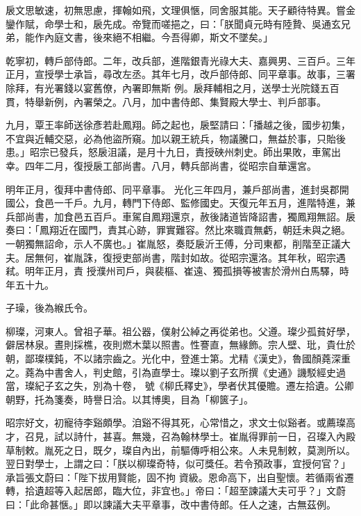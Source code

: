 \begin{pinyinscope}
 扆文思敏速，初無思慮，揮翰如飛，文理俱愜，同舍服其能。天子顧待特異。嘗金鑾作賦，命學士和，扆先成。帝覽而嗟挹之，曰：「朕聞貞元時有陸贄、吳通玄兄弟，能作內庭文書，後來絕不相繼。今吾得卿，斯文不墜矣。」



 乾寧初，轉戶部侍郎。二年，改兵部，進階銀青光祿大夫、嘉興男、三百戶。三年正月，宣授學士承旨，尋改左丞。其年七月，改戶部侍郎、同平章事。故事，三署除拜，有光署錢以宴舊僚，內署即無斯
 例。扆拜輔相之月，送學士光院錢五百貫，特舉新例，內署榮之。八月，加中書侍郎、集賢殿大學士、判戶部事。



 九月，覃王率師送徐彥若赴鳳翔。師之起也，扆堅請曰：「播越之後，國步初集，不宜與近輔交惡，必為他盜所窺。加以親王統兵，物議騰口，無益於事，只貽後患。」昭宗已發兵，怒扆沮議，是月十九日，責授硤州刺史。師出果敗，車駕出幸。四年二月，復授扆工部尚書。八月，轉兵部尚書，從昭宗自華還宮。



 明年正月，復拜中書侍郎、同平章事。
 光化三年四月，兼戶部尚書，進封吳郡開國公，食邑一千戶。九月，轉門下侍郎、監修國史。天復元年五月，進階特進，兼兵部尚書，加食邑五百戶。車駕自鳳翔還京，赦後諸道皆降詔書，獨鳳翔無詔。扆奏曰：「鳳翔近在國門，責其心跡，罪實難容。然比來職貢無虧，朝廷未與之絕。一朝獨無詔命，示人不廣也。」崔胤怒，奏貶扆沂王傅，分司東都，削階至正議大夫。居無何，崔胤誅，復授吏部尚書，階封如故。從昭宗還洛。其年秋，昭宗遇弒。明年正月，責
 授濮州司戶，與裴樞、崔遠、獨孤損等被害於滑州白馬驛，時年五十九。



 子璪，後為緱氏令。



 柳璨，河東人。曾祖子華。祖公器，僕射公綽之再從弟也。父遵。璨少孤貧好學，僻居林泉。晝則採樵，夜則燃木葉以照書。性謇直，無緣飾。宗人壁、玭，貴仕於朝，鄙璨樸鈍，不以諸宗齒之。光化中，登進士第。尤精《漢史》，魯國顏蕘深重之。蕘為中書舍人，判史館，引為直學士。璨以劉子玄所撰《史通》譏駁經史過當，璨紀子玄之失，別為十卷，
 號《柳氏釋史》，學者伏其優贍。遷左拾遺。公卿朝野，托為箋奏，時譽日洽。以其博奧，目為「柳篋子」。



 昭宗好文，初寵待李谿頗學。洎谿不得其死，心常惜之，求文士似谿者。或薦璨高才，召見，試以詩什，甚喜。無幾，召為翰林學士。崔胤得罪前一日，召璨入內殿草制敕。胤死之日，既夕，璨自內出，前驅傳呼相公來。人未見制敕，莫測所以。翌日對學士，上謂之曰：「朕以柳璨奇特，似可獎任。若令預政事，宜授何官？」承旨張文蔚曰：「陛下拔用賢能，固不拘
 資級。恩命高下，出自聖懷。若循兩省遷轉，拾遺超等入起居郎，臨大位，非宜也。」帝曰：「超至諫議大夫可乎？」文蔚曰：「此命甚愜。」即以諫議大夫平章事，改中書侍郎。任人之速，古無茲例。




\end{pinyinscope}
